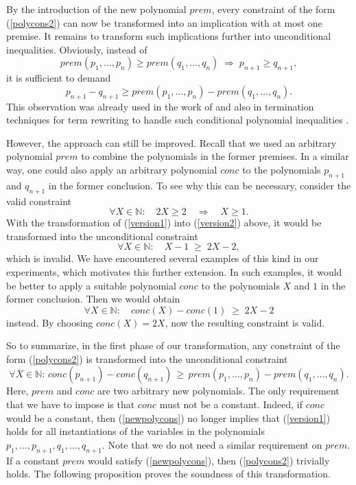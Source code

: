 \documentclass[envcountsame]{tlp}
\newcounter{polycons2ctr}
\newcounter{polycons1ctr}
\newcounter{ex:der-lastsymconsctr}
\begin{document}
By the introduction of the new polynomial $\mathit{prem}$, 
every constraint of the form (\ref{polycons2}) can now be transformed into an
implication with at most one premise. It remains to
transform such implications further into unconditional 
inequalities.
Obviously, instead of 
\begin{equation}
\label{version1}
\mathit{prem}(p_1,\ldots,p_n) \ge
\mathit{prem}(q_1,\ldots,q_n)
\; \Rightarrow \; p_{n+1} \ge q_{n+1},
\end{equation}
it is sufficient to demand 
\begin{equation}
\label{version2} p_{n+1} - q_{n+1} \ge
\mathit{prem}(p_1,\ldots,p_n) - \mathit{prem}(q_1,\ldots,q_n).
\end{equation}
This observation
was already used in the work of \cite{Decorteetal98} and also in termination
techniques for term rewriting  
to handle such conditional
polynomial inequalities
\cite{CADE98,CADE07}.

However, the approach can still be improved.
Recall that we used an arbitrary polynomial $\mathit{prem}$ to combine the
polynomials in the former premises. In a similar way, one could also apply an
arbitrary polynomial  $\mathit{conc}$ to the polynomials $p_{n+1}$ and
$q_{n+1}$ in
the former conclusion.
To see why this can be necessary, consider the valid constraint
\[ \forall X \in \mathbb{N}: \quad 2 X \geq 2 \quad \Rightarrow \quad X \geq 1.\]
With the transformation of (\ref{version1}) into 
(\ref{version2})
above, it would be transformed into the unconditional
constraint
\[ \forall X \in \mathbb{N}: \quad X -1 \; \geq \; 2 X - 2,\]
which is invalid. 
We have encountered several examples of this kind in our experiments, 
which motivates this further extension. In such examples, it 
would be better to apply a suitable
polynomial  $\mathit{conc}$ to the polynomials $X$ and $1$ in the former
conclusion. Then we would obtain
\[ \forall X \in \mathbb{N}: \quad \mathit{conc}(X) -\mathit{conc}(1) \; \geq \; 2 X - 2\]
instead. By choosing $\mathit{conc}(X) = 2 X$, now the resulting constraint
is valid.

So to summarize, in the first phase of our transformation,
any constraint of the form
(\ref{polycons2})
is transformed into the  unconditional constraint
\begin{equation}
\label{newpolycons}  \forall \overline{X} \in \mathbb{N}: \, \mathit{conc}(p_{n+1}) -
\mathit{conc}(q_{n+1}) \, \ge  \, \mathit{prem}(p_1,\ldots,p_n) -
\mathit{prem}(q_1,\ldots,q_n).
\end{equation}
Here, $\mathit{prem}$ and $\mathit{conc}$ are two arbitrary
new polynomials. The only requirement that we have to impose is that
 $\mathit{conc}$ must not be a constant. Indeed, if $\mathit{conc}$ would 
be a constant, then (\ref{newpolycons}) no longer implies that
(\ref{version1}) holds for all instantiations of the variables in the
polynomials $p_1,\ldots,p_{n+1},q_1,\ldots,q_{n+1}$. 
Note that we do not need a similar requirement on $\mathit{prem}$.
If a constant $\mathit{prem}$ would satisfy (\ref{newpolycons}), then 
(\ref{polycons2}) trivially holds.
 The following proposition proves the soundness of this transformation. 
\end{document}
